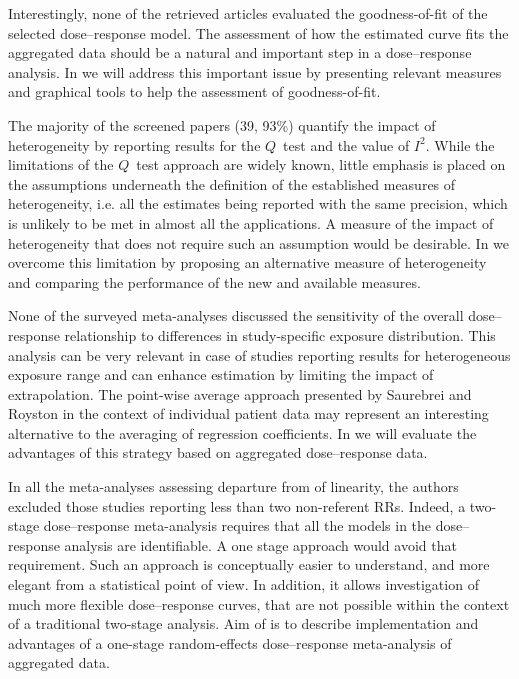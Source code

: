 \documentclass[11pt,a4paper,twoside,openany]{book}\usepackage{knitr}
\begin{document}
{\noindent Interestingly, none of the retrieved articles evaluated the goodness-of-fit of the selected dose--response model. The assessment of how the estimated curve fits the aggregated data should be a natural and important step in a dose--response analysis. In  we will address this important issue by presenting relevant measures and graphical tools to help the assessment of goodness-of-fit.

\noindent The majority of the screened papers (39, 93\%) quantify the impact of heterogeneity by reporting results for the $Q$~test and the value of $I^2$. While the limitations of the $Q$~test approach are widely known, little emphasis is placed on the assumptions underneath the definition of the established measures of heterogeneity, i.e.  all the estimates being reported with the same precision, which is unlikely to be met in almost all the applications. A measure of the impact of heterogeneity that does not require such an assumption would be desirable. In  we overcome this limitation by proposing an alternative measure of heterogeneity and comparing the performance of the new and available measures.

\noindent  None of the surveyed meta-analyses discussed the sensitivity of the overall dose--response relationship to differences in study-specific exposure distribution. This analysis can be very relevant in case of studies reporting results for heterogeneous exposure range and can enhance estimation by limiting the impact of extrapolation. The point-wise average approach presented by Saurebrei and Royston in the context of individual patient data may represent an interesting alternative to the averaging of regression coefficients. In  we will evaluate the advantages of this strategy based on aggregated dose--response data.

\noindent In all the meta-analyses assessing departure from of linearity, the authors excluded those studies reporting less than two non-referent RRs. Indeed, a two-stage dose--response meta-analysis requires that all the models in the dose--response analysis are identifiable. A one stage approach would avoid that requirement. Such an approach is conceptually easier to understand, and more elegant from a statistical point of view. In addition, it allows investigation of much more flexible dose--response curves, that are not possible within the context of a traditional two-stage analysis. Aim of  is to describe implementation and advantages of a one-stage random-effects dose--response meta-analysis of aggregated data.

}
\end{document}
